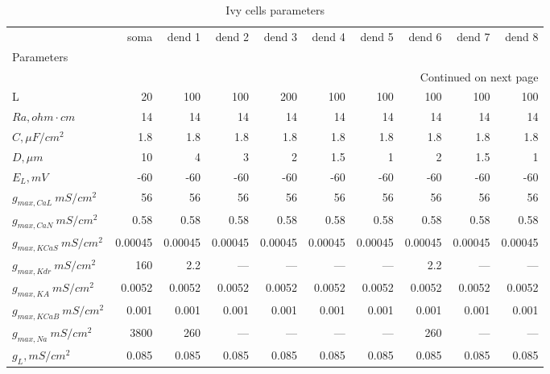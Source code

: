{\scriptsize
\begin{longtable}{lrrrrrrrrr}
\caption{Ivy cells parameters}\label{ca1_ivy_cell_parameters}\\
\toprule
{} &    soma &  dend 1 &  dend 2 &  dend 3 &  dend 4 &  dend 5 &  dend 6 &  dend 7 &  dend 8 \\
Parameters         &         &         &         &         &         &         &         &         &         \\
\midrule
\endhead
\midrule
\multicolumn{10}{r}{{Continued on next page}} \\
\midrule
\endfoot

\bottomrule
\endlastfoot
L                  &      20 &     100 &     100 &     200 &     100 &     100 &     100 &     100 &     100 \\
$Ra,
 ohm \cdot cm$                 &      14 &      14 &      14 &      14 &      14 &      14 &      14 &      14 &      14 \\
$C, \mu F / cm^2$                 &     1.8 &     1.8 &     1.8 &     1.8 &     1.8 &     1.8 &     1.8 &     1.8 &     1.8 \\
$D, \mu m$               &      10 &       4 &       3 &       2 &     1.5 &       1 &       2 &     1.5 &       1 \\
$E_L,  mV$          &     -60 &     -60 &     -60 &     -60 &     -60 &     -60 &     -60 &     -60 &     -60 \\
$g_{max, CaL       }\  mS / cm^2$&      56 &      56 &      56 &      56 &      56 &      56 &      56 &      56 &      56 \\
$g_{max, CaN       }\  mS / cm^2$&    0.58 &    0.58 &    0.58 &    0.58 &    0.58 &    0.58 &    0.58 &    0.58 &    0.58 \\
$g_{max, KCaS       }\  mS / cm^2$& 0.00045 & 0.00045 & 0.00045 & 0.00045 & 0.00045 & 0.00045 & 0.00045 & 0.00045 & 0.00045 \\
$g_{max, Kdr }\  mS / cm^2$&     160 &     2.2 &    ---  &    ---  &    ---  &    ---  &     2.2 &    ---  &    ---  \\
$g_{max, KA     }\  mS / cm^2$&  0.0052 &  0.0052 &  0.0052 &  0.0052 &  0.0052 &  0.0052 &  0.0052 &  0.0052 &  0.0052 \\
$g_{max, KCaB      }\  mS / cm^2$&   0.001 &   0.001 &   0.001 &   0.001 &   0.001 &   0.001 &   0.001 &   0.001 &   0.001 \\
$g_{max, Na     }\  mS / cm^2$&    3800 &     260 &    ---  &    ---  &    ---  &    ---  &     260 &    ---  &    ---  \\
$g_L,  mS / cm^2$       &   0.085 &   0.085 &   0.085 &   0.085 &   0.085 &   0.085 &   0.085 &   0.085 &   0.085 \\
\end{longtable}
}